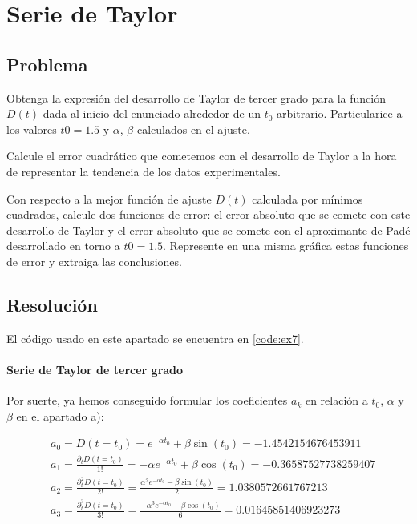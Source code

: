\section{Serie de Taylor}

\subsection{Problema}
Obtenga la expresión del desarrollo de Taylor de tercer grado para la función $D(t)$
dada al inicio del enunciado alrededor de un $t_0$ arbitrario. Particularice a los valores 
$t0 = 1.5$ y $\alpha$, $\beta$ calculados en el ajuste.

Calcule el error cuadrático que cometemos con el desarrollo de Taylor a la hora
de representar la tendencia de los datos experimentales.

Con respecto a la mejor función de ajuste $D(t)$ calculada por mínimos cuadrados,
calcule dos funciones de error: el error absoluto que se comete con este desarrollo de
Taylor y el error absoluto que se comete con el aproximante de Padé desarrollado
en torno a $t0 = 1.5$. Represente en una misma gráfica estas funciones de error y
extraiga las conclusiones.

\subsection{Resolución}

El código usado en este apartado se encuentra en \ref{code:ex7}.

\paragraph{Serie de Taylor de tercer grado}
Por suerte, ya hemos conseguido formular los coeficientes $a_k$ en relación a $t_0$, $\alpha$ y $\beta$ en el apartado a):

\begin{align*}
	&a_0 = D(t=t_0)  = e^{-\alpha t_0} + \beta \sin(t_0)
	= -1.4542154676453911 \\
&a_1 = \frac{\partial_t D(t=t_0)}{1!} 
= -\alpha e^{-\alpha t_0} + \beta \cos(t_0) 
= -0.36587527738259407\\
&a_2 = \frac{\partial_t^2 D(t=t_0)}{2!}
= \frac{\alpha^2 e^{-\alpha t_0} - \beta \sin(t_0)}{2}
= 1.0380572661767213\\
&a_3 = \frac{\partial_t^3 D(t=t_0)}{3!}
= \frac{-\alpha^3 e^{-\alpha t_0} - \beta \cos(t_0)}{6}	
= 0.01645851406923273
\end{align*}

